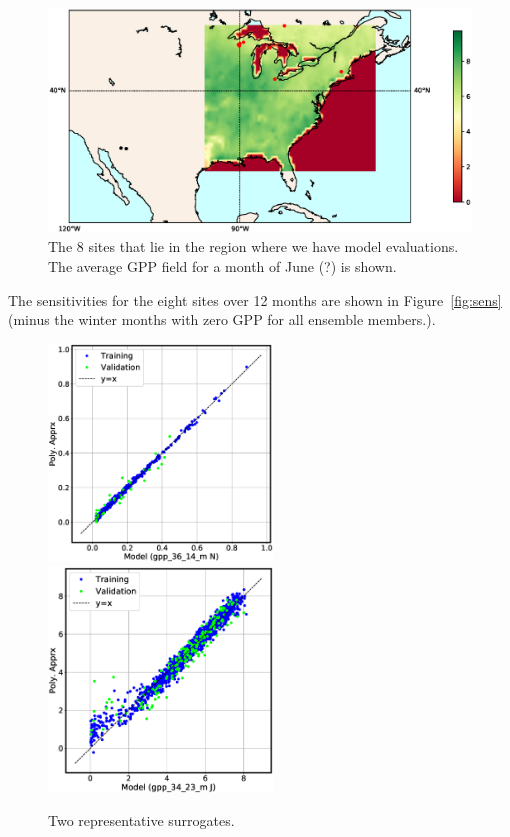 \documentclass[12pt]{article}
\begin{document}
\begin{figure}[!hb]
\includegraphics[width=\textwidth]{figs/map.eps}
\caption{\label{fig:map} The 8 sites that lie in the region where we have model evaluations. The average GPP field for a month of June (?) is shown.}
\end{figure}

The sensitivities for the eight sites over 12 months are shown in Figure~\ref{fig:sens} (minus the winter months with zero GPP for all ensemble members.).

\begin{figure}[!hb]
\includegraphics[width=0.53\textwidth]{figs/fit_13498.eps}\hfill
\includegraphics[width=0.53\textwidth]{figs/fit_19974.eps}
\caption{\label{fig:surr} Two representative surrogates.}
\end{figure}
\end{document}
